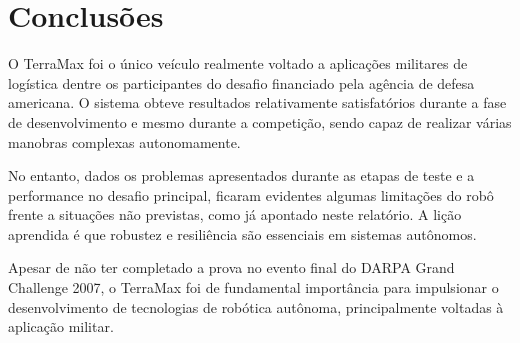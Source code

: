 \section{Conclusões}

O TerraMax foi o único veículo realmente voltado a aplicações militares de logística dentre os participantes do desafio financiado pela agência de defesa americana. O sistema obteve resultados relativamente satisfatórios durante a fase de desenvolvimento e mesmo durante a competição, sendo capaz de realizar várias manobras complexas autonomamente.

No entanto, dados os problemas apresentados durante as etapas de teste e a performance no desafio principal, ficaram evidentes algumas limitações do robô frente a situações não previstas, como já apontado neste relatório. A lição aprendida é que robustez e resiliência são essenciais em sistemas autônomos.

Apesar de não ter completado a prova no evento final do DARPA Grand Challenge 2007, o TerraMax foi de fundamental importância para impulsionar o desenvolvimento de tecnologias de robótica autônoma, principalmente voltadas à aplicação militar.

